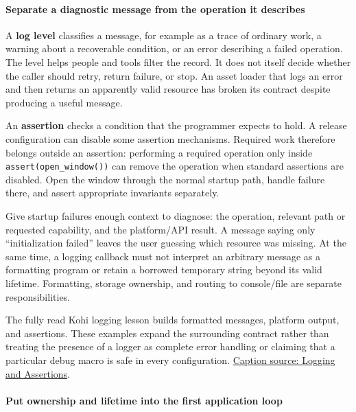\paragraph{Separate a diagnostic message from the operation it describes}\label{separate-a-diagnostic-message-from-the-operation-it-describes}

A \textbf{log level} classifies a message, for example as a trace of ordinary work, a warning about a recoverable condition, or an error describing a failed operation. The level helps people and tools filter the record. It does not itself decide whether the caller should retry, return failure, or stop. An asset loader that logs an error and then returns an apparently valid resource has broken its contract despite producing a useful message.

An \textbf{assertion} checks a condition that the programmer expects to hold. A release configuration can disable some assertion mechanisms. Required work therefore belongs outside an assertion: performing a required operation only inside \texttt{assert(open\_window())} can remove the operation when standard assertions are disabled. Open the window through the normal startup path, handle failure there, and assert appropriate invariants separately.

Give startup failures enough context to diagnose: the operation, relevant path or requested capability, and the platform/API result. A message saying only ``initialization failed'' leaves the user guessing which resource was missing. At the same time, a logging callback must not interpret an arbitrary message as a formatting program or retain a borrowed temporary string beyond its valid lifetime. Formatting, storage ownership, and routing to console/file are separate responsibilities.

The fully read Kohi logging lesson builds formatted messages, platform output, and assertions. These examples expand the surrounding contract rather than treating the presence of a logger as complete error handling or claiming that a particular debug macro is safe in every configuration. \href{https://www.youtube.com/watch?v=l9e8PJskYnI}{Caption source: Logging and Assertions}.

\paragraph{Put ownership and lifetime into the first application loop}\label{put-ownership-and-lifetime-into-the-first-application-loop}


